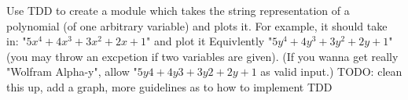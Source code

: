 \begin{problem}
Use TDD to create a module which takes the string representation of a polynomial (of one arbitrary variable) and plots it.
For example, it should take in:
"$5x^4 + 4x^3 + 3x^2+ 2x + 1$" and plot it
Equivlently "$5y^4 + 4y^3 + 3y^2+ 2y + 1$" (you may throw an excpetion if two variables are given).
(If you wanna get really "Wolfram Alpha-y", allow "$5y4 + 4y3 + 3y2+ 2y + 1$ as valid input.)  TODO: clean this up, add a graph, more guidelines as to how to implement TDD
\end{problem}


